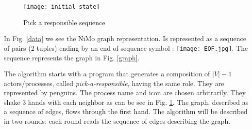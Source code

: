 \documentclass{article}                     \usepackage{graphics}
\begin{document}
 \begin{figure}[h]
	\centering
	\texttt{[image: initial-state]}
	\caption{Pick a responsible sequence}
	\label{Pick}
\end{figure}

In Fig. \ref{data} we see the NiMo graph representation.  Is represented as a sequence of pairs (2-tuples) ending by an end of sequence symbol : \texttt{[image: EOF.jpg]}.  The sequence represents the graph in Fig. \ref{graph}.

The algorithm starts with a program that generates a composition of $|V|-1$ actors/processes, called \textit{pick-a-responsible}, having the same role. They are represented by penguins. The process name and icon are chosen arbitrarily. They  shake 3 hands with each neighbor as can be see in Fig. \ref{Pick}. The graph, described as a sequence of edges,  flows through the first hand. The algorithm will be described in two rounds: each round reads the sequence of edges describing the graph.
\end{document}
